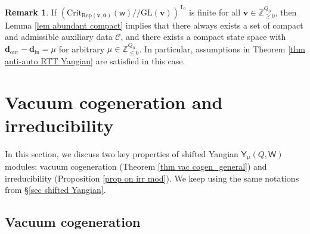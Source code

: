 \documentclass[10pt]{amsart}
\theoremstyle{definition}
\newtheorem{Definition}[Theorem]{Definition}
\newtheorem{Remark}[Theorem]{Remark}
\numberwithin{equation}{section}
\newcommand{\GL}{\mathrm{GL}}
\newcommand{\Crit}{\mathrm{Crit}}
\newcommand{\bZ}{\mathbb{Z}}
\newcommand{\bv}{\mathbf{v}}
\newcommand{\bd}{\mathbf{d}}
\newcommand{\cH}{\mathcal{H}}
\newcommand{\cM}{\mathcal{M}}
\newcommand{\sA}{\mathsf{A}}
\newcommand{\sT}{\mathsf{T}}
\newcommand{\sW}{\mathsf{W}}
\newcommand{\sw}{\mathsf{w}}
\newcommand{\In}{\operatorname{in}}
\newcommand{\Out}{\operatorname{out}}
\begin{document}
\begin{Remark}
If $\left(\Crit_{\mathrm{Rep}(\bv,\mathbf 0)}(\sw)/\!\!/ \GL(\bv)\right)^{\sT_0}$ is finite for all $\bv\in \bZ_{\geqslant 0}^{Q_0}$, then Lemma \ref{lem abundant compact} implies that there always exists a set of compact and admissible auxiliary data $\mathcal C$, and there exists a compact state space with $\bd_{\Out}-\bd_{\In}=\mu$ for arbitrary $\mu\in \bZ_{\leqslant 0}^{Q_0}$. In particular, assumptions in Theorem \ref{thm anti-auto RTT Yangian} are satisfied in this case.
\end{Remark}






\section{Vacuum cogeneration and irreducibility}\label{sec property_module}

In this section, we discuss two key properties of shifted Yangian $\mathsf Y_{\mu}(Q,\sW)$ modules: vacuum cogeneration (Theorem \ref{thm vac cogen_general}) and irreducibility (Proposition \ref{prop on irr mod}). We keep using the same notations from \S \ref{sec shifted Yangian}.


\subsection{Vacuum cogeneration}
\end{document}

